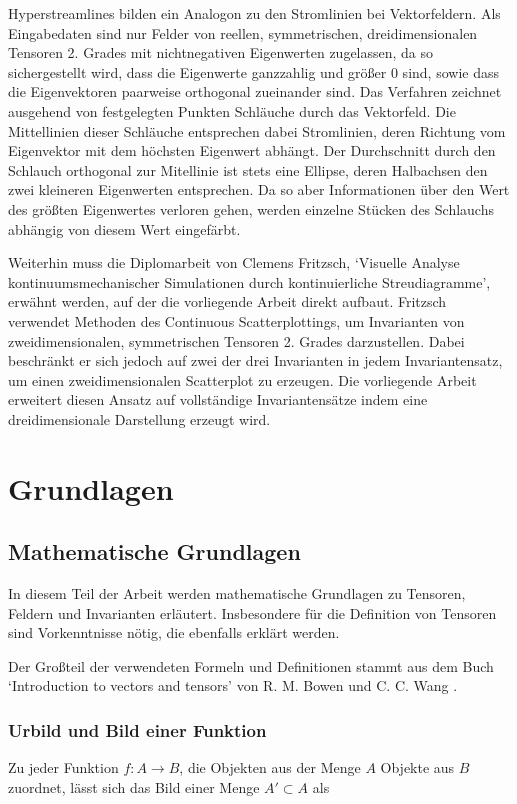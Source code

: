 \documentclass[a4paper,fontsize=12pt,toc=bib,halfparskip]{scrartcl}
\begin{document}
Hyperstreamlines\cite{delmarcelle1993visualizing} bilden ein Analogon zu den Stromlinien bei Vektorfeldern. Als Eingabedaten sind nur Felder von reellen, symmetrischen, dreidimensionalen Tensoren 2. Grades mit nichtnegativen Eigenwerten zugelassen, da so sichergestellt wird, dass die Eigenwerte ganzzahlig und gr\"o{\ss}er 0 sind, sowie dass die Eigenvektoren paarweise orthogonal zueinander sind. Das Verfahren zeichnet ausgehend von festgelegten Punkten Schl\"auche durch das Vektorfeld. Die Mittellinien dieser Schl\"auche entsprechen dabei Stromlinien, deren Richtung vom Eigenvektor mit dem h\"ochsten Eigenwert abh\"angt. Der Durchschnitt durch den Schlauch orthogonal zur Mitellinie ist stets eine Ellipse, deren Halbachsen den zwei kleineren Eigenwerten entsprechen. Da so aber Informationen \"uber den Wert des gr\"o{\ss}ten Eigenwertes verloren gehen, werden einzelne St\"ucken des Schlauchs abh\"angig von diesem Wert eingef\"arbt.

Weiterhin muss die Diplomarbeit von Clemens Fritzsch, `Visuelle Analyse kontinuumsmechanischer Simulationen durch kontinuierliche Streudiagramme'\cite{fritzsch2016continuousScatterplot}, erw\"ahnt werden, auf der die vorliegende Arbeit direkt aufbaut. Fritzsch verwendet Methoden des Continuous Scatterplottings, um Invarianten von zweidimensionalen, symmetrischen Tensoren 2. Grades darzustellen. Dabei beschr\"ankt er sich jedoch auf zwei der drei Invarianten in jedem Invariantensatz, um einen zweidimensionalen Scatterplot zu erzeugen. Die vorliegende Arbeit erweitert diesen Ansatz auf vollst\"andige Invariantens\"atze indem eine dreidimensionale Darstellung erzeugt wird.

\section{Grundlagen}
\label{sec:Grundlagen}
\subsection{Mathematische Grundlagen}
In diesem Teil der Arbeit werden mathematische Grundlagen zu Tensoren, Feldern und Invarianten erl\"autert. Insbesondere f\"ur die Definition von Tensoren sind Vorkenntnisse n\"otig, die ebenfalls erkl\"art werden. 

Der Gro{\ss}teil der verwendeten Formeln und Definitionen stammt aus dem Buch `Introduction to vectors and tensors' von R. M. Bowen und C. C. Wang \cite{bowen2008introduction}.

\subsubsection{Urbild und Bild einer Funktion}
Zu jeder Funktion $f: A \rightarrow B$, die Objekten aus der Menge $A$ Objekte aus $B$ zuordnet, l\"asst sich das Bild einer Menge $A' \subset A$ als
\end{document}
